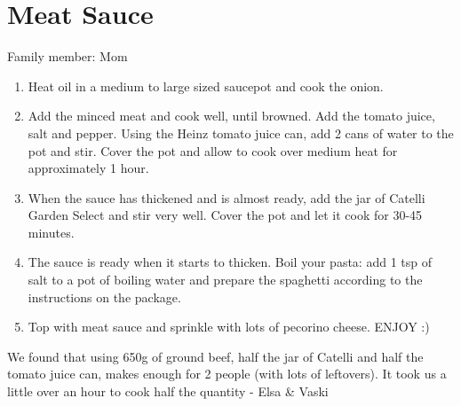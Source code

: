 \chapter{Meat Sauce}
\label{ch:meatsauce}


Family member: Mom

\begin{enumerate}
    \item Heat oil in a medium to large sized saucepot and cook the onion.
    \item Add the minced meat and cook well, until browned. Add the tomato juice, salt and pepper. Using the Heinz tomato juice can, add 2 cans of water to the pot and stir. Cover the pot and allow to cook over medium heat for approximately 1 hour.
    \item When the sauce has thickened and is almost ready, add the jar of Catelli Garden Select and stir very well. Cover the pot and let it cook for 30-45 minutes.
    \item The sauce is ready when it starts to thicken. Boil your pasta: add 1 tsp of salt to a pot of boiling water and prepare the spaghetti according to the instructions on the package.
    \item Top with meat sauce and sprinkle with lots of pecorino cheese. ENJOY :)
\end{enumerate}

We found that using 650g of ground beef, half the jar of Catelli and half the tomato juice can, makes enough for 2 people (with lots of leftovers). It took us a little over an hour to cook half the quantity - Elsa \& Vaski

